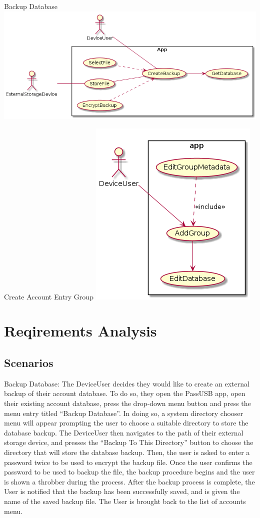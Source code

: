 \documentclass[stu]{apa7}
\begin{document}
{{Backup Database
\includegraphics[scale=0.5]{diag/gt/uc1.png}

Create Account Entry Group
\includegraphics[scale=0.5]{diag/gt/uc2.png}

\section{Reqirements Analysis}

\subsection{Scenarios}

Backup Database: The DeviceUser decides they would like to create an external backup of their account database. To do so, they open the PassUSB app, open their existing account database, press the drop-down menu button and press the menu entry titled ``Backup Database''. In doing so, a system directory chooser menu will appear prompting the user to choose a suitable directory to store the database backup. The DeviceUser then navigates to the path of their external storage device, and presses the ``Backup To This Directory'' button to choose the directory that will store the database backup. Then, the user is asked to enter a password twice to be used to encrypt the backup file. Once the user confirms the password to be used to backup the file, the backup procedure begins and the user is shown a throbber during the process. After the backup process is complete, the User is notified that the backup has been successfully saved, and is given the name of the saved backup file. The User is brought back to the list of accounts menu.

}}
\end{document}
